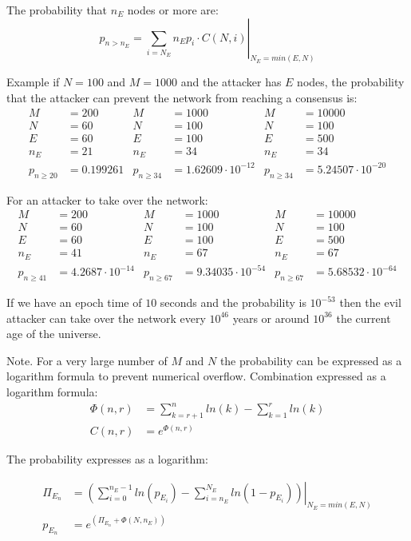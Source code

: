 The probability that $n_E$ nodes or more are:
\begin{equation}
 p_{n>n_E} = \left. \sum_{i=N_E}{n_E}{p_i \cdot C(N,i)} \right|_{N_E = min(E,N)}
\end{equation}


Example if $N=100$ and $M=1000$ and the attacker has $E$ nodes, the probability that the attacker can prevent the network from reaching a consensus is:
\begin{align*}
 M &= 200 & M &= 1000 & M &= 10000 \\
 N &= 60 & N &= 100 & N &= 100 \\
 E &= 60 & E &= 100 & E &= 500 \\
 n_E &= 21 & n_E &= 34 & n_E &= 34 \\
 p_{n \ge 20 } &= 0.199261 & p_{n \ge 34} &= 1.62609 \cdot 10^{-12} & p_{n \ge 34} &= 5.24507 \cdot 10^{-20}
\end{align*}

For an attacker to take over the network:
\begin{align*}
 M &= 200 & M &= 1000 & M &= 10000 \\
 N &= 60 & N &= 100 & N &= 100 \\
 E &= 60 & E &= 100 & E &= 500 \\
 n_E &= 41 & n_E &= 67 & n_E &= 67 \\
 p_{n \ge 41 } &= 4.2687 \cdot 10^{-14} & p_{n \ge 67} &= 9.34035 \cdot 10^{-54} & p_{n \ge 67} &= 5.68532 \cdot 10^{-64}
\end{align*}


If we have an epoch time of $10$ seconds and the probability is $10^{-53}$ then the evil attacker can take over the network every $10^{46}$ years or around $10^{36}$ the current age of the universe.

Note.
For a very large number of $M$ and $N$ the probability can be expressed as a logarithm formula to prevent numerical overflow.
Combination expressed as a logarithm formula:
\begin{align*}
 \Phi (n,r) &= \sum_{k=r+1}^{n}{ln(k)} - \sum_{k=1}^{r}{ln(k)} \\
 C(n,r) &= e^{{\Phi}(n,r)}
\end{align*}


The probability expresses as a logarithm:

\begin{align*}
{\Pi}_{E_n} &= \left. \left( \sum_{i=0}^{n_E-1}{ln(p_{E_i})} - \sum_{i=n_E}^{N_E}{ln(1-p_{E_i})} \right) 
\right|_{N_E = min(E,N)} \\
p_{E_n} &= e^{({\Pi}_{E_n}+\Phi(N,n_E))}
\end{align*}


